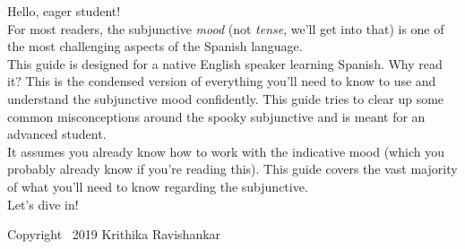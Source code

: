 Hello, eager student!\\

For most readers, the subjunctive \textit{mood} (not \textit{tense}, we'll get into that) is one of the most challenging aspects of the Spanish language. \\

This guide is designed for a native English speaker learning Spanish. Why read it? This is the condensed version of everything you'll need to know to use and understand the subjunctive mood confidently. This guide tries to clear up some common misconceptions around the spooky subjunctive and is meant for an advanced student. \\

It assumes you already know how to work with the indicative mood (which you probably already know if you're reading this). This guide covers the vast majority of what you'll need to know regarding the subjunctive.  \\

Let's dive in!

\vfill
{\footnotesize Copyright \textcopyright\ 2019 Krithika Ravishankar}
